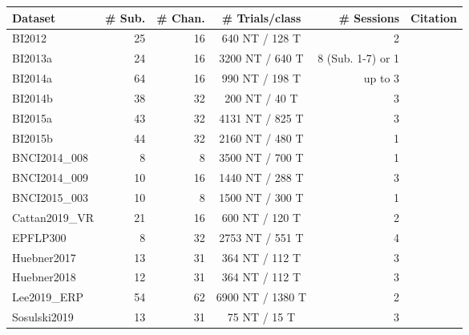 \begin{tabularx}{\linewidth}{Xrrcrl}
		\toprule
		Dataset        & \# Sub.               & \# Chan. & \# Trials/class              & \# Sessions & Citation                   \\ \midrule
		BI2012         & 25                         & 16          & 640 NT / 128 T           & 2                          &                                          \\
		BI2013a        & 24                         & 16          & 3200 NT / 640 T
                   & 8 (Sub. 1-7) or 1  &                                          \\
		BI2014a        & 64                         & 16          & 990 NT / 198 T           & up to 3                    &                                          \\
		BI2014b        & 38                         & 32          & 200 NT / 40 T            & 3                          &                                          \\
		BI2015a        & 43                         & 32          & 4131 NT / 825 T          & 3                          &                                          \\
		BI2015b        & 44                         & 32          & 2160 NT / 480 T          & 1                          &                                          \\
		BNCI2014\_008  & 8                          & 8           & 3500 NT / 700 T          & 1                          &                                         \\
		BNCI2014\_009  & 10                         & 16          & 1440 NT / 288 T          & 3                          &                                         \\
		BNCI2015\_003  & 10                         & 8           & 1500 NT / 300 T          & 1                          &                                          \\
		Cattan2019\_VR & 21                         & 16          & 600 NT / 120 T           & 2                          &                                          \\
		EPFLP300       & 8                          & 32          & 2753 NT / 551 T          & 4                          &                                          \\
		Huebner2017    & 13                         & 31          & 364 NT / 112 T           & 3                          &                                          \\
		Huebner2018    & 12                         & 31          & 364 NT / 112 T           & 3                          &                                          \\
		Lee2019\_ERP   & 54                         & 62          & 6900 NT / 1380 T         & 2                          &                                          \\
		Sosulski2019   & 13                         & 31          & 75 NT / 15 T             & 3                          &                                          \\ \bottomrule
	\end{tabularx}
